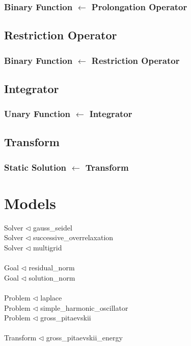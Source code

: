 \documentclass{article}
\begin{document}
\subsubsection{Binary Function $\leftarrow$ Prolongation Operator}

\subsection{Restriction Operator}
\subsubsection{Binary Function $\leftarrow$ Restriction Operator}

\subsection{Integrator}
\subsubsection{Unary Function $\leftarrow$ Integrator}

\subsection{Transform}
\subsubsection{Static Solution $\leftarrow$ Transform}
\section{Models}
Solver $\triangleleft$  gauss\_seidel \\
Solver $\triangleleft$  successive\_overrelaxation \\
Solver $\triangleleft$  multigrid \\
\\
Goal $\triangleleft$  residual\_norm \\
Goal $\triangleleft$  solution\_norm \\
\\
Problem $\triangleleft$  laplace \\
Problem $\triangleleft$  simple\_harmonic\_oscillator \\
Problem $\triangleleft$  gross\_pitaevskii \\
\\
Transform $\triangleleft$ gross\_pitaevskii\_energy\\
\end{document}
